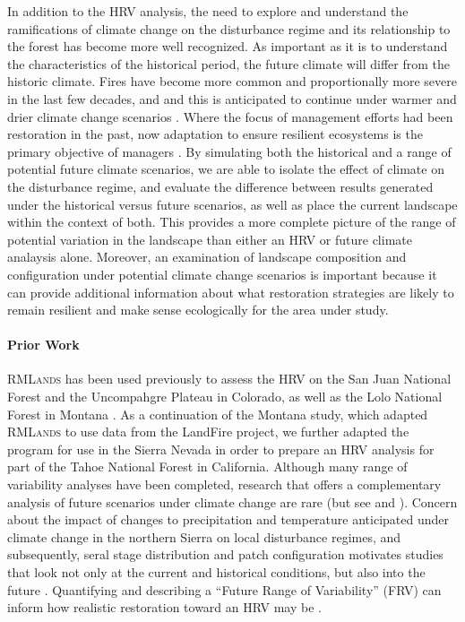 \documentclass[12pt]{article}
\begin{document}
\begin{spacing}{1}
In addition to the HRV analysis, the need to explore and understand the ramifications of climate change on the disturbance regime and its relationship to the forest has become more well recognized. As important as it is to understand the characteristics of the historical period, the future climate will differ from the historic climate. Fires have become more common and proportionally more severe in the last few decades, and and this is anticipated to continue under warmer and drier climate change scenarios \citep{McKenzie2004,Westerling2007}. Where the focus of management efforts had been restoration in the past, now adaptation to ensure resilient ecosystems is the primary objective of managers \citep{Stephens2010}. By simulating both the historical and a range of potential future climate scenarios, we are able to isolate the effect of climate on the disturbance regime, and evaluate the difference between results generated under the historical versus future scenarios, as well as place the current landscape within the context of both. This provides a more complete picture of the range of potential variation in the landscape than either an HRV or future climate analaysis alone. Moreover, an examination of landscape composition and configuration under potential climate change scenarios is important because it can provide additional information about what restoration strategies are likely to remain resilient and make sense ecologically for the area under study. 

\paragraph{Prior Work}
\textsc{RMLands} has been used previously to assess the HRV on the San Juan National Forest \citep{Mcgarigal2012} and the Uncompahgre Plateau \citep{Romme2009} in Colorado, as well as the Lolo National Forest in Montana \citep{Cushman2011}. As a continuation of the Montana study, which adapted \textsc{RMLands} to use data from the LandFire project, we further adapted the program for use in the Sierra Nevada in order to prepare an HRV analysis for part of the Tahoe National Forest in California. Although many range of variability analyses have been completed, research that offers a complementary analysis of future scenarios under climate change are rare (but see \cite{Keane2008} and \cite{Duveneck2014}). Concern about the impact of changes to precipitation and temperature anticipated under climate change in the northern Sierra on local disturbance regimes, and subsequently, seral stage distribution and patch configuration motivates studies that look not only at the current and historical conditions, but also into the future \citep{Fule2008,North2012}. Quantifying and describing a ``Future Range of Variability'' (FRV) can inform how realistic restoration toward an HRV may be \citep{Duncan2010}.


\end{spacing}
\end{document}
